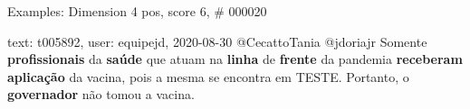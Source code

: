 \begin{frame}{Examples: Dimension 4 pos, score 6, \# 000020}
\footnotesize
\begin{exampleblock}{text: t005892, user: equipejd, 2020-08-30}
@CecattoTania @jdoriajr Somente \textbf{profissionais} da \textbf{saúde} que 
atuam na \textbf{linha} de \textbf{frente} da pandemia \textbf{receberam} 
\textbf{aplicação} da vacina, pois a mesma se encontra em TESTE. Portanto, o 
\textbf{governador} não tomou a vacina. 
\end{exampleblock}
\end{frame}
